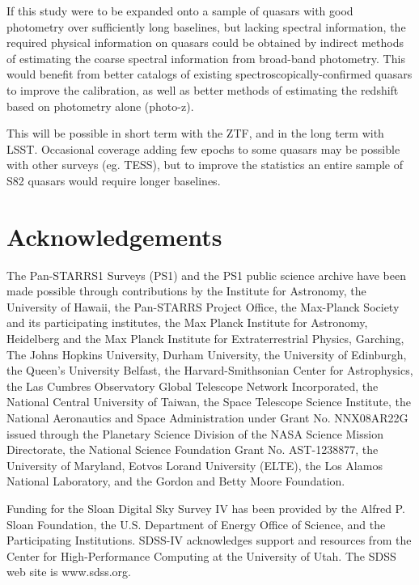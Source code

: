 \documentclass[twocolumn]{aastex62}
\begin{document}
If this study were to be expanded onto a sample of quasars with good photometry over sufficiently long baselines, but lacking spectral information, the required physical information on quasars could be obtained by indirect methods of estimating the coarse spectral information from broad-band photometry. This would benefit from better catalogs of existing spectroscopically-confirmed quasars to improve the calibration, as well as better methods of estimating the redshift based on photometry alone (photo-z). 

 This will be possible in short term with the ZTF, and in the long term with LSST. Occasional coverage adding few epochs to some quasars may be possible with other surveys (eg. TESS), but to improve the statistics an entire sample of S82 quasars would require longer baselines. 


\section{Acknowledgements}
%
%
%
%
%
%

The Pan-STARRS1 Surveys (PS1) and the PS1 public science archive have been made possible through contributions by the Institute for Astronomy, the University of Hawaii, the Pan-STARRS Project Office, the Max-Planck Society and its participating institutes, the Max Planck Institute for Astronomy, Heidelberg and the Max Planck Institute for Extraterrestrial Physics, Garching, The Johns Hopkins University, Durham University, the University of Edinburgh, the Queen's University Belfast, the Harvard-Smithsonian Center for Astrophysics, the Las Cumbres Observatory Global Telescope Network Incorporated, the National Central University of Taiwan, the Space Telescope Science Institute, the National Aeronautics and Space Administration under Grant No. NNX08AR22G issued through the Planetary Science Division of the NASA Science Mission Directorate, the National Science Foundation Grant No. AST-1238877, the University of Maryland, Eotvos Lorand University (ELTE), the Los Alamos National Laboratory, and the Gordon and Betty Moore Foundation.

Funding for the Sloan Digital Sky Survey IV has been provided by the Alfred P. Sloan Foundation, the U.S. Department of Energy Office of Science, and the Participating Institutions. SDSS-IV acknowledges
support and resources from the Center for High-Performance Computing at
the University of Utah. The SDSS web site is www.sdss.org.
\end{document}
